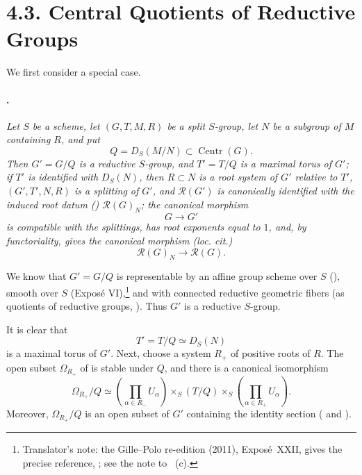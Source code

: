 \section*{4.3. Central
Quotients of Reductive Groups}

We first consider a special case.

\paragraph{.}
\textit{Let \(S\) be a scheme, let \((G,T,M,R)\) be a split
\(S\)-group, let \(N\) be a subgroup of \(M\) containing \(R\),
and put}
\[
  Q=D_S(M/N)\subset\operatorname{Centr}(G).
\]
\textit{Then \(G'=G/Q\) is a reductive \(S\)-group, and \(T'=T/Q\) is a
maximal torus of \(G'\); if \(T'\) is identified with \(D_S(N)\),
then \(R\subset N\) is a root system of \(G'\) relative to \(T'\),
\((G',T',N,R)\) is a splitting of \(G'\), and
\(\mathscr R(G')\) is canonically identified with the induced root
datum \textup{()} \(\mathscr R(G)_N\); the canonical
morphism}
\[
  G\longrightarrow G'
\]
\textit{is compatible with the splittings, has root exponents equal
to \(1\), and, by functoriality, gives the canonical morphism
\textup{(loc. cit.)}}
\[
  \mathscr R(G)_N\longrightarrow\mathscr R(G).
\]

We know that \(G'=G/Q\) is representable by an affine group scheme
over \(S\) \textup{()}, smooth over \(S\)
\textup{(Exposé VI)},\footnote{Translator's note: the Gille--Polo re-edition (2011), Exposé~XXII, gives the
precise reference, ; see the note to ~(c).} and with connected
reductive geometric fibers \textup{(as quotients of reductive
groups, )}. Thus \(G'\) is a reductive
\(S\)-group.

It is clear that
\[
  T'=T/Q\simeq D_S(N)
\]
is a maximal torus of \(G'\). Next, choose a system \(R_+\) of
positive roots of \(R\). The open subset \(\Omega_{R_+}\) of  is
stable under \(Q\), and there is a canonical isomorphism
\[
  \Omega_{R_+}/Q
  \simeq
  \left(\prod_{\alpha\in R_-}U_\alpha\right)
  \mathop{\times}_S(T/Q)
  \mathop{\times}_S
  \left(\prod_{\alpha\in R_+}U_\alpha\right).
\]
Moreover, \(\Omega_{R_+}/Q\) is an open subset of \(G'\) containing
the identity section \textup{( and )}.

